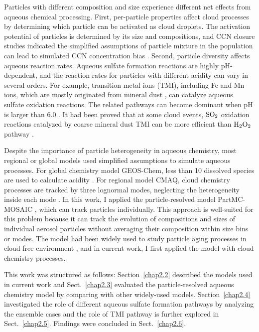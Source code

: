 \documentclass[edeposit,fullpage]{uiucthesis2009}
\begin{document}
Particles with different composition and size experience different net effects from aqueous chemical processing. First, per-particle properties affect cloud processes by determining which particle can be activated as cloud droplets. The activation potential of particles is determined by its size and compositions, and CCN closure studies indicated the simplified assumptions of particle mixture in the population can lead to simulated CCN concentration bias \citep{Broekhuizen2006, Bhattu2015}. Second, particle diversity affects aqueous reaction rates. Aqueous sulfate formation reactions are highly pH-dependent, and the reaction rates for particles with different acidity can vary in several orders. For example, transition metal ions (TMI), including Fe and Mn ions, which are mostly originated from mineral dust \citep{alexander2009transition}, can catalyze aqueous sulfate oxidation reactions. The related pathways can become dominant when pH is larger than 6.0 \citep{Seinfeld2006a}. It had been proved that at some cloud events, $\rm SO_2$ oxidation reactions catalyzed by coarse mineral dust TMI can be more efficient than $\rm H_2O_2$ pathway \citep{Harris2013a, Harris2014}. 

Despite the importance of particle heterogeneity in aqueous chemistry, most regional or global models used simplified assumptions to simulate aqueous processes. For global chemistry model GEOS-Chem, less than 10 dissolved species are used to calculate acidity \citep{alexander2012isotopic}.
For regional model CMAQ, cloud chemistry processes are tracked by three lognormal modes, neglecting the heterogeneity inside each mode \citep{fahey2017framework}. In this work, I applied the particle-resolved model PartMC-MOSAIC \citep{Riemer2009, Zaveri2010a}, which can track particles individually. This approach is well-suited for this problem because it can track the evolution of compositions and sizes of individual aerosol particles without averaging their composition within size bins or modes. The model had been widely used to study particle aging processes in cloud-free environment \citep{ching2012impacts, Ching2016}, and in current work, I first applied the model with cloud chemistry processes. 

This work was structured as follows: Section~\ref{chap2.2} described the models used in current work and Sect.~\ref{chap2.3} evaluated the particle-resolved aqueous chemistry model by comparing with other widely-used models. Section~\ref{chap2.4} investigated the role of different aqueous sulfate formation pathways by analyzing the ensemble cases and the role of TMI pathway is further explored in Sect.~\ref{chap2.5}. Findings were concluded in Sect.~\ref{chap2.6}. 
\end{document}
